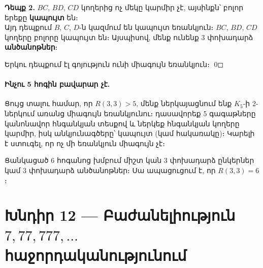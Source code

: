 \documentclass[12pt, a4paper]{article}
\begin{document}
\textbf{Դեպք 2.} $BC$, $BD$, $CD$ կողերից ոչ մեկը կարմիր չէ, այսինքն՝ բոլոր երեքը
\textbf{կապույտ} են։\\
Այդ դեպքում $B$, $C$, $D$-ն կազմում են կապույտ եռանկյուն։ $BC$, $BD$, $CD$ կողերը
բոլորը կապույտ են։
Այսպիսով, մենք ունենք 3 փոխադարձ \textbf{անծանոթներ}։

\medskip
Երկու դեպքում էլ գոյություն ունի միագույն եռանկյուն։ \qed

\paragraph{Ինչու 5 հոգին բավարար չէ.}
Ցույց տալու համար, որ $R(3,3) > 5$, մենք ներկայացնում ենք $K_5$-ի 2-ներկում
առանց միագույն եռանկյունու։ դասավորեք 5 գագաթները կանոնավոր հնգանկյան տեսքով
և ներկեք հնգանկյան կողերը կարմիր, իսկ անկյունագծերը՝ կապույտ (կամ հակառակը)։
Կարելի է ստուգել, որ ոչ մի եռանկյուն միագույն չէ։

\begin{center}
\end{center}

\begin{answerbox}
\centering
Ցանկացած 6 հոգանոց խմբում միշտ կան 3 փոխադարձ ընկերներ
կամ 3 փոխադարձ անծանոթներ։ Սա ապացուցում է, որ $R(3,3) = 6$։
\end{answerbox}

\newpage
\section{Խնդիր 12 — Բաժանելիություն \texorpdfstring{$7, 77, 777, \ldots$}{7, 77, 777, ...} հաջորդականությունում}
\end{document}
